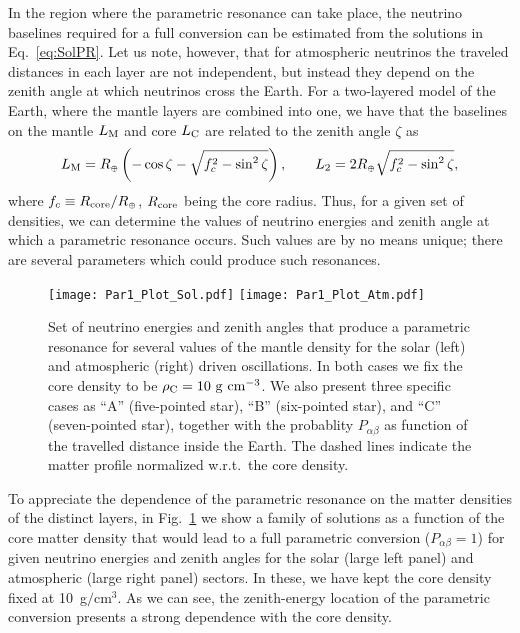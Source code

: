 In the region where the parametric resonance can take place, the neutrino baselines required for a full conversion can be estimated from the solutions in Eq.~\eqref{eq:SolPR}. 
Let us note, however, that for atmospheric neutrinos the traveled distances in each layer are not independent, but instead they depend on the zenith angle at which neutrinos cross the Earth. 
For a two-layered model of the Earth, where the mantle layers are combined into one, we have that the baselines on the mantle $L_{\rm M}$ and core $L_{\rm C}$ are related to the zenith angle $\zeta$ as
\begin{align}
 L_{\rm M} = R_{\scriptscriptstyle\oplus}\left(-\cos\zeta-\sqrt{f_c^2-\sin^2\zeta}\right),\qquad L_2 = 2R_{\scriptscriptstyle\oplus}\sqrt{f_c^2-\sin^2\zeta},
\end{align}
where $f_c\equiv R_{\rm core}/R_{\scriptscriptstyle\oplus}$, $R_{\rm core}$ being the core radius. 
Thus, for a given set of densities, we can determine the values of neutrino energies and zenith angle at which a parametric resonance occurs.
Such values are by no means unique; there are several parameters which could produce such resonances. 

\begin{figure}[t]
\begin{center}
\texttt{[image: Par1\_Plot\_Sol.pdf]}
\texttt{[image: Par1\_Plot\_Atm.pdf]}
\caption{Set of neutrino energies and zenith angles that produce a parametric resonance for several values of the mantle density for the solar (left) and atmospheric (right) driven oscillations. In both cases we fix the core density to be $\rho_{\rm C}=10~{\rm g\ cm^{-3}}$. We also present three specific cases as ``A'' (five-pointed star), ``B'' (six-pointed star), and ``C'' (seven-pointed star), together with the probablity $P_{\alpha\beta}$ as function of the travelled distance inside the Earth. The dashed lines indicate the matter profile normalized w.r.t.~the core density. \label{fig:DepRhoPR}}
\end{center}
\end{figure}
To appreciate the dependence of the parametric resonance on the matter densities of the distinct layers, in Fig.~\ref{fig:DepRhoPR} we show a family of solutions as a function of the core matter density that would lead to a full parametric conversion ($P_{\alpha\beta}=1$) for given neutrino energies and zenith angles  for the solar (large left panel) and atmospheric (large right panel) sectors. 
In these, we have  kept the core density fixed at 10~g$/$cm$^3$. 
As we can see, the zenith-energy location of the parametric conversion presents a strong dependence with the core density.


